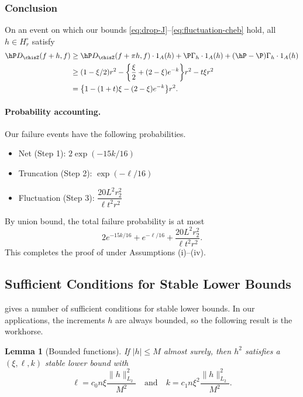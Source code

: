 \documentclass{article}
\newtheorem{lemma}[theorem]{Lemma}
\begin{document}
\subsubsection{Conclusion}

On an event on which our bounds \eqref{eq:drop-J}--\eqref{eq:fluctuation-cheb} hold, all $h \in H_r^\circ$ satisfy
\begin{equation}
\label{eq:extension-bound}
\begin{aligned}
\hP D_{\chisZ}(f+h, f) &\ge \hP D_{\chisZ}(f+\pi h, f) \cdot 1_A(h) + \P \Gamma_h \cdot 1_A(h) + (\hP-\P) \Gamma_h \cdot 1_A(h) \notag \\
&\ge (1 - \xi/2) r^2 - \qty{\frac{\xi}{2} + (2 - \xi) e^{-k}} r^2 - t\xi r^2 \notag \\
&= \qty{1 - (1+t)\xi - (2 - \xi) e^{-k}} r^2.
\end{aligned}
\end{equation}

\paragraph{Probability accounting.} Our failure events have the following probabilities.
\begin{itemize}
\item Net (Step 1): $2\exp(-15k/16)$
\item Truncation (Step 2): $\exp(-\ell/16)$
\item Fluctuation (Step 3): $\dfrac{20 L^2 r_2^2}{\ell t^2 r^2}$
\end{itemize}
By union bound, the total failure probability is at most
\[
2e^{-15k/16} + e^{-\ell/16} + \frac{20 L^2 r_2^2}{\ell t^2 r^2}.
\]
This completes the proof of  under Assumptions (i)--(iv).

\subsection{Sufficient Conditions for Stable Lower Bounds}

\citet{mendelson2021extending} gives a number of sufficient conditions for stable lower bounds. In our applications, the increments $h$ are always bounded, so the following result is the workhorse.

\begin{lemma}[Bounded functions]
\label{lem:slb-bounded}
If $|h| \le M$ almost surely, then $h^2$ satisfies a $(\xi, \ell, k)$ stable lower bound with
\[
\ell = c_0 n \xi \frac{\|h\|_{L_2}^2}{M^2} \quad \text{and} \quad k = c_1 n \xi^2 \frac{\|h\|_{L_2}^2}{M^2}.
\]
\end{lemma}
\end{document}

